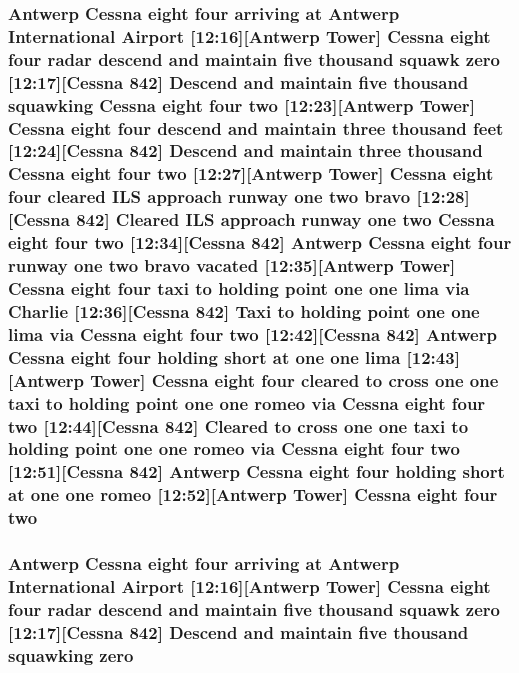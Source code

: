 \subsubsection[{\texorpdfstring{two}{two}}]{\setlength{\rightskip}{0pt plus 5cm}Antwerp {\bf Cessna} eight four arriving at Antwerp International {\bf Airport} \mbox{[}12\+:16\mbox{]}\mbox{[}Antwerp {\bf Tower}\mbox{]} {\bf Cessna} eight four radar descend and maintain five {\bf thousand} squawk {\bf zero} \mbox{[}12\+:17\mbox{]}\mbox{[}{\bf Cessna} 842\mbox{]} Descend and maintain five {\bf thousand} {\bf squawking} {\bf Cessna} eight four two \mbox{[}12\+:23\mbox{]}\mbox{[}Antwerp {\bf Tower}\mbox{]} {\bf Cessna} eight four descend and maintain three {\bf thousand} {\bf feet} \mbox{[}12\+:24\mbox{]}\mbox{[}{\bf Cessna} 842\mbox{]} Descend and maintain three {\bf thousand} {\bf Cessna} eight four two \mbox{[}12\+:27\mbox{]}\mbox{[}Antwerp {\bf Tower}\mbox{]} {\bf Cessna} eight four cleared I\+LS approach runway {\bf one} two {\bf bravo} \mbox{[}12\+:28\mbox{]}\mbox{[}{\bf Cessna} 842\mbox{]} Cleared I\+LS approach runway {\bf one} two {\bf Cessna} eight four two \mbox{[}12\+:34\mbox{]}\mbox{[}{\bf Cessna} 842\mbox{]} Antwerp {\bf Cessna} eight four runway {\bf one} two {\bf bravo} vacated \mbox{[}12\+:35\mbox{]}\mbox{[}Antwerp {\bf Tower}\mbox{]} {\bf Cessna} eight four taxi to holding point {\bf one} {\bf one} {\bf lima} via {\bf Charlie} \mbox{[}12\+:36\mbox{]}\mbox{[}{\bf Cessna} 842\mbox{]} Taxi to holding point {\bf one} {\bf one} {\bf lima} via {\bf Cessna} eight four two \mbox{[}12\+:42\mbox{]}\mbox{[}{\bf Cessna} 842\mbox{]} Antwerp {\bf Cessna} eight four holding short at {\bf one} {\bf one} {\bf lima} \mbox{[}12\+:43\mbox{]}\mbox{[}Antwerp {\bf Tower}\mbox{]} {\bf Cessna} eight four cleared to cross {\bf one} {\bf one} taxi to holding point {\bf one} {\bf one} {\bf romeo} via {\bf Cessna} eight four two \mbox{[}12\+:44\mbox{]}\mbox{[}{\bf Cessna} 842\mbox{]} Cleared to cross {\bf one} {\bf one} taxi to holding point {\bf one} {\bf one} {\bf romeo} via {\bf Cessna} eight four two \mbox{[}12\+:51\mbox{]}\mbox{[}{\bf Cessna} 842\mbox{]} Antwerp {\bf Cessna} eight four holding short at {\bf one} {\bf one} {\bf romeo} \mbox{[}12\+:52\mbox{]}\mbox{[}Antwerp {\bf Tower}\mbox{]} {\bf Cessna} eight four two}\hypertarget{happyDay3ATC_8txt_a87da3704f93719801d287ba965c4f715}{}\label{happyDay3ATC_8txt_a87da3704f93719801d287ba965c4f715}
\subsubsection[{\texorpdfstring{zero}{zero}}]{\setlength{\rightskip}{0pt plus 5cm}Antwerp {\bf Cessna} eight four arriving at Antwerp International {\bf Airport} \mbox{[}12\+:16\mbox{]}\mbox{[}Antwerp {\bf Tower}\mbox{]} {\bf Cessna} eight four radar descend and maintain five {\bf thousand} squawk zero \mbox{[}12\+:17\mbox{]}\mbox{[}{\bf Cessna} 842\mbox{]} Descend and maintain five {\bf thousand} {\bf squawking} zero}\hypertarget{happyDay3ATC_8txt_adce466d7618784129bcb0feb6d2d98e4}{}\label{happyDay3ATC_8txt_adce466d7618784129bcb0feb6d2d98e4}
